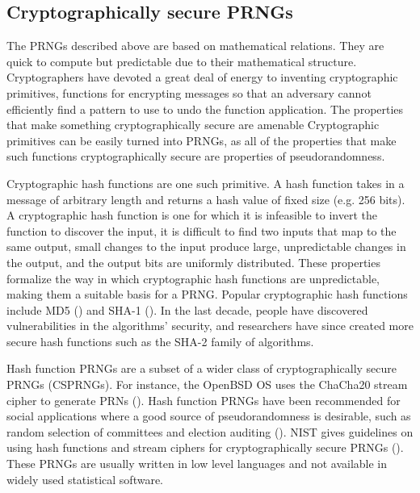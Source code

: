 \documentclass[12pt]{article}
\begin{document}
\subsection{Cryptographically secure PRNGs}

The PRNGs described above are based on mathematical relations.
They are quick to compute but predictable due to their mathematical structure.
Cryptographers have devoted a great deal of energy to inventing cryptographic primitives,
functions for encrypting messages so that an adversary cannot efficiently find a pattern to use to undo the function application.
The properties that make something cryptographically secure are amenable
Cryptographic primitives can be easily turned into PRNGs, as all of the properties that make such functions cryptographically secure
are properties of pseudorandomness.

Cryptographic hash functions are one such primitive.
A hash function takes in a message of arbitrary length and returns a hash value of fixed size (e.g. 256 bits).
A cryptographic hash function is one for which it is infeasible to invert the function to discover the input,
 it is difficult to find two inputs that map to the same output,
 small changes to the input produce large, unpredictable changes in the output,
 and the output bits are uniformly distributed.
These properties formalize the way in which cryptographic hash functions are unpredictable, making them a suitable basis for a PRNG.
Popular cryptographic hash functions include MD5 (\cite{rivest_md5_1992}) and SHA-1 (\cite{eastlake_us_2001}).
In the last decade, people have discovered vulnerabilities in the algorithms' security, and researchers have since created more secure hash functions such as the SHA-2 family of algorithms.

Hash function PRNGs are a subset of a wider class of cryptographically secure PRNGs (CSPRNGs).
For instance, the OpenBSD OS uses the ChaCha20 stream cipher to generate PRNs (\cite{openbsd_arc4random_2014, chacha_bernstein_208}).
Hash function PRNGs have been recommended for social applications where a good source of pseudorandomness is desirable, such as random selection of committees and election auditing (\cite{publicly_motorola_2004, rivest_reference_2011}).
NIST gives guidelines on using hash functions and stream ciphers for cryptographically secure PRNGs (\cite{barker_nist_2015}).
These PRNGs are usually written in low level languages and not available in widely used statistical software.
\end{document}

